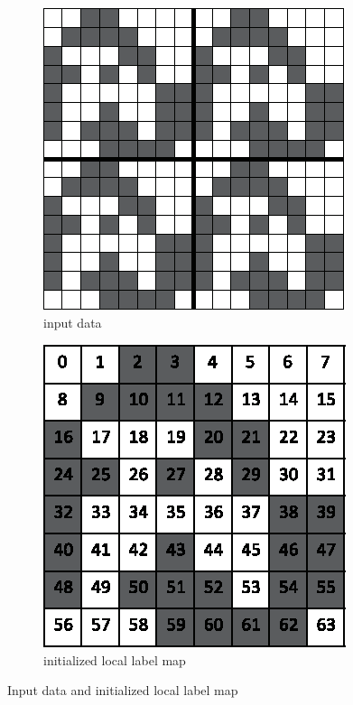 \documentclass[a4paper, 11pt]{article}
\begin{document}
\begin{figure}[H]
	\centering
	\begin{subfigure}[b]{0.3\textwidth}
		\includegraphics[width=\textwidth]{images/cuda_uf/uf_1.eps}
		\caption{input data}
		\label{fig:cuda_uf_1}
	\end{subfigure}
	\hspace{1mm} 
	\begin{subfigure}[b]{0.3\textwidth}
		\includegraphics[width=\textwidth]{images/cuda_uf/uf_2.eps}
		\caption{initialized local label map}
		\label{fig:cuda_uf_2}
	\end{subfigure}
	\caption{Input data and initialized local label map}
\end{figure}
\end{document}

